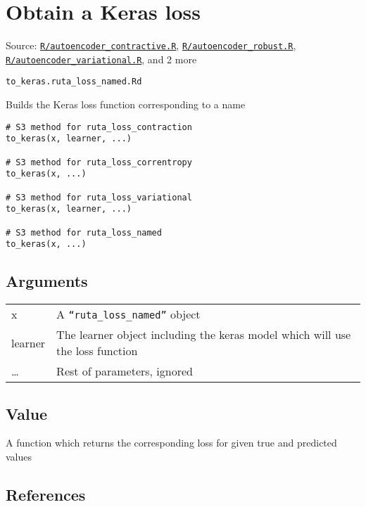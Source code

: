 \section{Obtain a Keras loss}\label{obtain-a-keras-loss}

Source:
\href{https://github.com/fdavidcl/ruta/blob/master/R/autoencoder_contractive.R}{\texttt{R/autoencoder\_contractive.R}},
\href{https://github.com/fdavidcl/ruta/blob/master/R/autoencoder_robust.R}{\texttt{R/autoencoder\_robust.R}},
\href{https://github.com/fdavidcl/ruta/blob/master/R/autoencoder_variational.R}{\texttt{R/autoencoder\_variational.R}},
and 2 more

\texttt{to\_keras.ruta\_loss\_named.Rd}

Builds the Keras loss function corresponding to a name

\begin{verbatim}
# S3 method for ruta_loss_contraction
to_keras(x, learner, ...)

# S3 method for ruta_loss_correntropy
to_keras(x, ...)

# S3 method for ruta_loss_variational
to_keras(x, learner, ...)

# S3 method for ruta_loss_named
to_keras(x, ...)
\end{verbatim}

\hypertarget{arguments}{\subsection{\texorpdfstring{\protect\hyperlink{arguments}{}Arguments}{Arguments}}\label{arguments}}

\begin{longtable}[c]{@{}>{\small}p{3cm}>{\raggedright}p{12.5cm}@{}}
\toprule
x & A \texttt{``ruta\_loss\_named''} object\tabularnewline
learner & The learner object including the keras model which will use
the loss function\tabularnewline
\ldots{} & Rest of parameters, ignored\tabularnewline
\bottomrule
\end{longtable}

\hypertarget{value}{\subsection{\texorpdfstring{\protect\hyperlink{value}{}Value}{Value}}\label{value}}

A function which returns the corresponding loss for given true and
predicted values

\hypertarget{references}{\subsection{\texorpdfstring{\protect\hyperlink{references}{}References}{References}}\label{references}}


